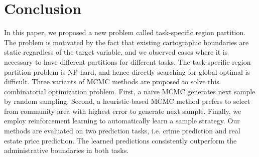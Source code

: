 \section{Conclusion}
\label{sec:conclusion}


In this paper, we proposed a new problem called task-specific region partition. The problem is motivated by the fact that existing cartographic boundaries are static regardless of the target variable, and we observed cases where it is necessary to have different partitions for different tasks. The task-specific region partition problem is NP-hard, and hence directly searching for global optimal is difficult. Three variants of MCMC methods are proposed to solve this combinatorial optimization problem. First, a naive MCMC generates next sample by random sampling. Second, a heuristic-based MCMC method prefers to select from community area with highest error to generate next sample. Finally, we employ reinforcement learning to automatically learn a sample strategy. Our methods are evaluated on two prediction tasks, i.e. crime prediction and real estate price prediction. The learned predictions consistently outperform the administrative boundaries in both tasks.